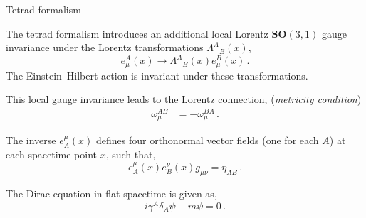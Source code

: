 \documentclass{beamer}
\newcommand\italictext[1]{\textcolor{italics}{\textit{#1}}}
\begin{document}
\begin{frame}{Tetrad formalism}
    \begin{list}{\maltese}{\leftmargin=1em \itemindent=0em}
        \item<1-> The tetrad formalism introduces an additional local Lorentz $\mathbf{SO}(3,1)$ gauge invariance under the Lorentz transformations ${\Lambda^A}_{B}(x)$,
        \begin{equation}
            e_\mu^A(x)\to {\Lambda^A}_{B}(x)e_\mu^B(x)\,.
        \end{equation}
        The Einstein–Hilbert action is invariant under these transformations.
        \item<2-> This local gauge invariance leads to the Lorentz connection, (\italictext{metricity condition})
        \begin{align}
            \omega_\mu^{AB}&=-\omega_\mu^{BA}\,.
        \end{align}
        \item<3-> The inverse $e^\mu_A(x)$ defines four orthonormal vector fields (one for each $A$) at each spacetime point $x$, such that,
        \begin{equation}
            e^\mu_A(x)e^\nu_B(x)g_{\mu\nu}=\eta_{AB}\,.
        \end{equation}
        \item<4-> The Dirac equation in flat spacetime is given as,
        \begin{equation}
            i\gamma^A\delta_A\psi-m\psi=0\,.
        \end{equation}
    \end{list}
\end{frame}
\end{document}
